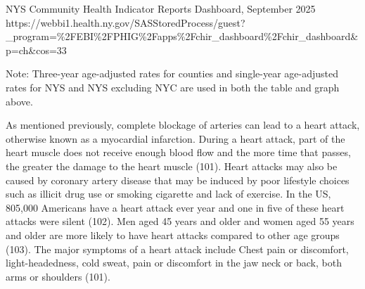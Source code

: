 \documentclass[
  english,
  letterpaper,
]{report}
\begin{document}
\begin{tcolorbox}[enhanced jigsaw, breakable, leftrule=.75mm, title=\textcolor{quarto-callout-note-color}{\faInfo}\hspace{0.5em}{Source}, bottomrule=.15mm, opacityback=0, left=2mm, colback=white, bottomtitle=1mm, coltitle=black, colbacktitle=quarto-callout-note-color!10!white, colframe=quarto-callout-note-color-frame, opacitybacktitle=0.6, toptitle=1mm, titlerule=0mm, arc=.35mm, rightrule=.15mm, toprule=.15mm]

NYS Community Health Indicator Reports Dashboard, September 2025
https://webbi1.health.ny.gov/SASStoredProcess/guest?\_program=\%2FEBI\%2FPHIG\%2Fapps\%2Fchir\_dashboard\%2Fchir\_dashboard\&p=ch\&cos=33

\end{tcolorbox}

\begin{tcolorbox}[enhanced jigsaw, breakable, leftrule=.75mm, title=\textcolor{quarto-callout-note-color}{\faInfo}\hspace{0.5em}{Note}, bottomrule=.15mm, opacityback=0, left=2mm, colback=white, bottomtitle=1mm, coltitle=black, colbacktitle=quarto-callout-note-color!10!white, colframe=quarto-callout-note-color-frame, opacitybacktitle=0.6, toptitle=1mm, titlerule=0mm, arc=.35mm, rightrule=.15mm, toprule=.15mm]

Note: Three-year age-adjusted rates for counties and single-year
age-adjusted rates for NYS and NYS excluding NYC are used in both the
table and graph above.

\end{tcolorbox}

As mentioned previously, complete blockage of arteries can lead to a
heart attack, otherwise known as a myocardial infarction. During a heart
attack, part of the heart muscle does not receive enough blood flow and
the more time that passes, the greater the damage to the heart muscle
(101). Heart attacks may also be caused by coronary artery disease that
may be induced by poor lifestyle choices such as illicit drug use or
smoking cigarette and lack of exercise. In the US, 805,000 Americans
have a heart attack ever year and one in five of these heart attacks
were silent (102). Men aged 45 years and older and women aged 55 years
and older are more likely to have heart attacks compared to other age
groups (103). The major symptoms of a heart attack include Chest pain or
discomfort, light-headedness, cold sweat, pain or discomfort in the jaw
neck or back, both arms or shoulders (101).
\end{document}
